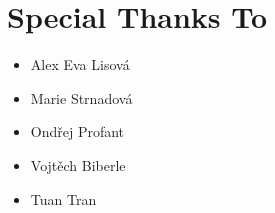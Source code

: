 
\chapter*{Special Thanks To}

\begin{itemize}
  \item[] Alex Eva Lisová
  \item[] Marie Strnadová
  \item[] Ondřej Profant
  \item[] Vojtěch Biberle
  \item[] Tuan Tran
\end{itemize}


